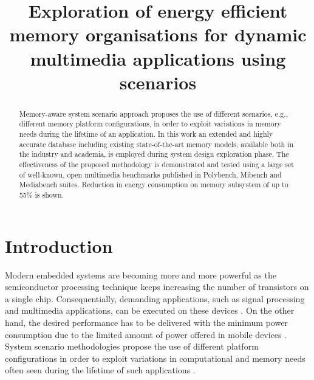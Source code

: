 \documentclass[a4paper,conference]{IEEEtran}
\begin{document}
\title{Exploration of energy efficient memory organisations for dynamic multimedia applications using scenarios}
\author{
}

\maketitle


\begin{abstract}
Memory-aware system scenario approach \cite{Fil12} proposes the use of different scenarios, e.g., different memory platform configurations, in order to exploit variations in  memory needs during the lifetime of an application. In this work an extended and highly accurate database including existing state-of-the-art memory models, available both in the industry and academia, is employed during system design exploration phase. The effectiveness of the proposed methodology is demonstrated and tested using a large set of well-known, open multimedia benchmarks published in Polybench, Mibench and Mediabench suites. Reduction in energy consumption on memory subsystem of up to 55\% is shown.
\end{abstract}
\IEEEpeerreviewmaketitle

\section{Introduction}
\label{sec:introduction}

Modern embedded systems are becoming more and more powerful as the semiconductor processing technique keeps increasing the number of transistors on a single chip. Consequentially, demanding applications, such as signal processing and multimedia applications, can be executed on these devices \cite{narasinga}. On the other hand, the desired performance has to be delivered with the minimum power consumption due to the limited amount of power offered in mobile devices \cite{tcm}. System scenario methodologies propose the use of different platform configurations in order to exploit variations in computational and memory needs often seen during the lifetime of such applications \cite{tcm}. 
\end{document}

